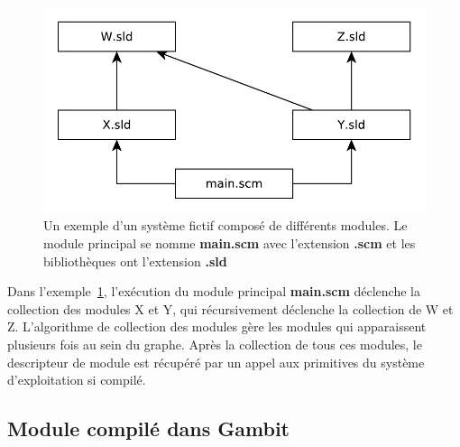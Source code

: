 \begin{figure}[ht]
  \includegraphics{figures/system-example}
  \caption{Un exemple d'un système fictif composé de différents modules.
  Le module principal se nomme \textbf{main.scm} avec l'extension \textbf{.scm}
  et les bibliothèques ont l'extension \textbf{.sld}}
  \label{fig:system-dependency-example}
\end{figure}


Dans l'exemple~\ref{fig:system-dependency-example}, l'exécution du module principal
\textbf{main.scm} déclenche la collection des modules X et Y, qui récursivement
déclenche la collection de W et Z.  L'algorithme de collection des modules gère
les modules qui apparaissent plusieurs fois au sein du graphe.  Après la
collection de tous ces modules, le descripteur de module est
récupéré par un appel aux primitives du système d'exploitation si compilé.


\subsection{Module compilé dans Gambit}

